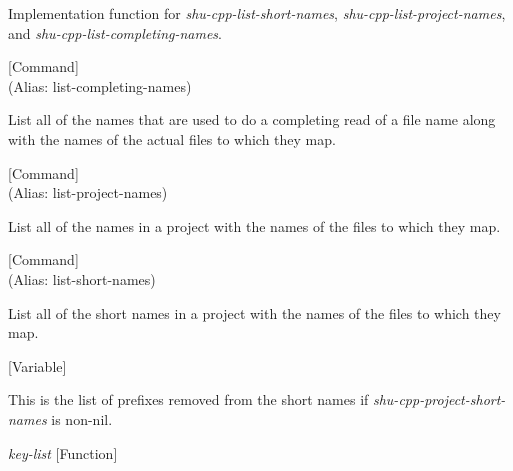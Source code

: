 \begin{doc-string}
Implementation function for \emph{shu-cpp-list-short-names},
\emph{shu-cpp-list-project-names}, and \emph{shu-cpp-list-completing-names}.
\end{doc-string}

\vspace{1em}
\noindent
{}
\usebox{\funcname}
 \hfill [Command]\\%
 (Alias: list-completing-names)

\begin{doc-string}
List all of the names that are used to do a completing read of a file name
along with the names of the actual files to which they map.
\end{doc-string}

\vspace{1em}
\noindent
{}
\usebox{\funcname}
 \hfill [Command]\\%
 (Alias: list-project-names)

\begin{doc-string}
List all of the names in a project with the names of the files to
which they map.
\end{doc-string}

\vspace{1em}
\noindent
{}
\usebox{\funcname}
 \hfill [Command]\\%
 (Alias: list-short-names)

\begin{doc-string}
List all of the short names in a project with the names of the files to
which they map.
\end{doc-string}

\vspace{1em}
\noindent
{}
\usebox{\funcname}
 \hfill [Variable]

\begin{doc-string}
This is the list of prefixes removed from the short names if
\emph{shu-cpp-project-short-names} is non-nil.
\end{doc-string}

\vspace{1em}
\noindent
{}
\usebox{\funcname}\emph{key-list}
 \hfill [Function]

